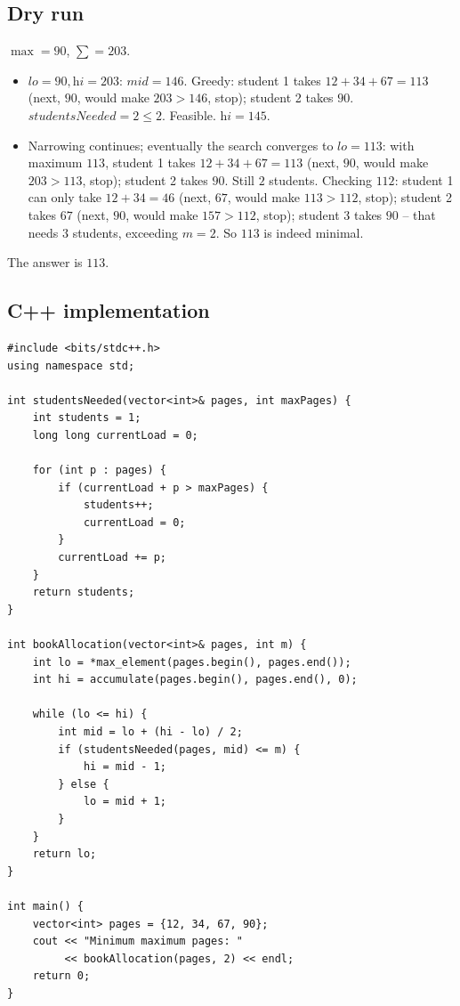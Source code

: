 \subsection*{Dry run}


$\max = 90$, $\sum = 203$.

\begin{itemize}
  \item $\textit{lo}=90,\textit{hi}=203$: $\textit{mid}=146$. Greedy:
        student 1 takes $12{+}34{+}67=113$ (next, $90$, would make
        $203>146$, stop); student 2 takes $90$. $\textit{studentsNeeded}=2
        \le 2$. Feasible. $\textit{hi}=145$.
  \item Narrowing continues; eventually the search converges to
        $\textit{lo}=113$: with maximum $113$, student 1 takes
        $12{+}34{+}67=113$ (next, $90$, would make $203>113$, stop);
        student 2 takes $90$. Still $2$ students. Checking $112$: student
        1 can only take $12{+}34=46$ (next, $67$, would make $113>112$,
        stop); student 2 takes $67$ (next, $90$, would make $157>112$,
        stop); student 3 takes $90$ -- that needs $3$ students, exceeding
        $m=2$. So $113$ is indeed minimal.
\end{itemize}

The answer is $113$.

\subsection*{C++ implementation}

\begin{lstlisting}
#include <bits/stdc++.h>
using namespace std;

int studentsNeeded(vector<int>& pages, int maxPages) {
    int students = 1;
    long long currentLoad = 0;

    for (int p : pages) {
        if (currentLoad + p > maxPages) {
            students++;
            currentLoad = 0;
        }
        currentLoad += p;
    }
    return students;
}

int bookAllocation(vector<int>& pages, int m) {
    int lo = *max_element(pages.begin(), pages.end());
    int hi = accumulate(pages.begin(), pages.end(), 0);

    while (lo <= hi) {
        int mid = lo + (hi - lo) / 2;
        if (studentsNeeded(pages, mid) <= m) {
            hi = mid - 1;
        } else {
            lo = mid + 1;
        }
    }
    return lo;
}

int main() {
    vector<int> pages = {12, 34, 67, 90};
    cout << "Minimum maximum pages: "
         << bookAllocation(pages, 2) << endl;
    return 0;
}
\end{lstlisting}

